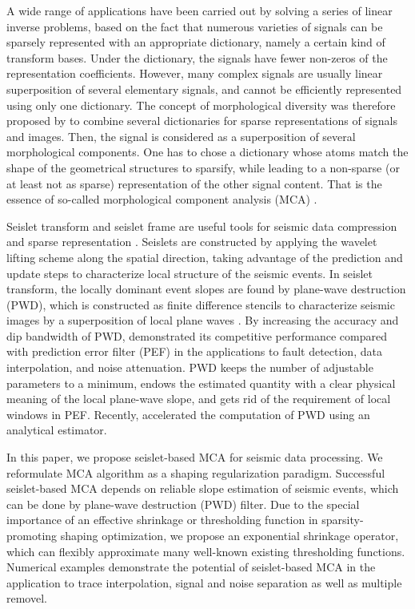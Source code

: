 A wide range of applications have been carried out by solving a series of linear inverse problems, based on the fact that numerous varieties of signals can be sparsely represented with an appropriate dictionary, namely a certain kind of transform bases. Under the dictionary, the signals have fewer non-zeros of the representation coefficients. However, many complex signals are usually linear superposition of several elementary signals, and cannot be efficiently represented using only one dictionary. The concept of morphological diversity was therefore proposed by \cite{starck2004redundant,starck2005image} to combine several dictionaries for sparse representations of signals and images. Then, the signal is considered as a superposition of several morphological components. One has to chose a dictionary whose atoms match the shape of the geometrical structures to sparsify, while leading to a non-sparse (or at least not as sparse) representation of the other signal content. That is the essence of so-called morphological component analysis (MCA) \citep{starck2004redundant,starck2007undecimated,woiselle20113}.

Seislet transform and seislet frame are useful tools for seismic data compression and sparse representation \citep{fomel2010seislet}. Seislets are constructed by applying the wavelet lifting scheme \citep{sweldens1998lifting} along the spatial direction, taking advantage of the prediction and update steps to characterize local structure of the seismic events.
In seislet transform, the locally dominant event slopes are found by plane-wave destruction (PWD), which is constructed as finite difference stencils to characterize seismic images by a superposition of local plane waves \citep{claerbout1992earth}. By increasing the accuracy and dip bandwidth of PWD, \cite{fomel2002applications} demonstrated its competitive performance compared with prediction error filter (PEF) in the applications to fault detection, data interpolation, and noise attenuation. PWD keeps the number of adjustable parameters to a minimum, endows the estimated quantity with a clear physical meaning of the local plane-wave slope, and gets rid of the requirement of local windows in PEF. Recently, \cite{chen2013accelerated} accelerated the computation of PWD using an analytical estimator.


In this paper, we propose seislet-based MCA for seismic data processing. We reformulate MCA algorithm as a shaping regularization paradigm. Successful seislet-based MCA depends on reliable slope estimation of seismic events, which can be done by plane-wave destruction (PWD) filter. Due to the special importance of an effective shrinkage or thresholding function in sparsity-promoting shaping optimization, we propose an exponential shrinkage operator, which can flexibly  approximate many well-known existing thresholding functions. Numerical examples demonstrate the potential of seislet-based MCA in the application to trace interpolation, signal and noise separation as well as multiple removel.


